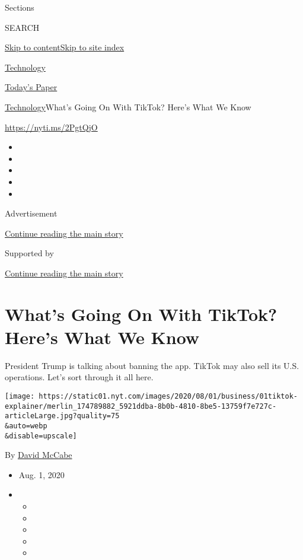 Sections

SEARCH

\protect\hyperlink{site-content}{Skip to
content}\protect\hyperlink{site-index}{Skip to site index}

\href{https://www.nytimes.com/section/technology}{Technology}

\href{https://myaccount.nytimes.com/auth/login?response_type=cookie\&client_id=vi}{}

\href{https://www.nytimes.com/section/todayspaper}{Today's Paper}

\href{/section/technology}{Technology}\textbar{}What's Going On With
TikTok? Here's What We Know

\url{https://nyti.ms/2PgtQjO}

\begin{itemize}
\item
\item
\item
\item
\item
\end{itemize}

Advertisement

\protect\hyperlink{after-top}{Continue reading the main story}

Supported by

\protect\hyperlink{after-sponsor}{Continue reading the main story}

\hypertarget{whats-going-on-with-tiktok-heres-what-we-know}{%
\section{What's Going On With TikTok? Here's What We
Know}\label{whats-going-on-with-tiktok-heres-what-we-know}}

President Trump is talking about banning the app. TikTok may also sell
its U.S. operations. Let's sort through it all here.

\texttt{[image: https://static01.nyt.com/images/2020/08/01/business/01tiktok-explainer/merlin\_174789882\_5921ddba-8b0b-4810-8be5-13759f7e727c-articleLarge.jpg?quality=75\\\&auto=webp\\\&disable=upscale]}

By \href{https://www.nytimes.com/by/david-mccabe}{David McCabe}

\begin{itemize}
\item
  Aug. 1, 2020
\item
  \begin{itemize}
  \item
  \item
  \item
  \item
  \item
  \end{itemize}
\end{itemize}

